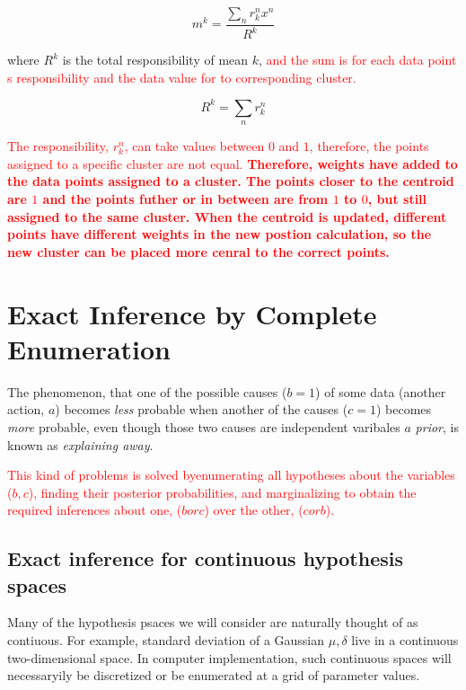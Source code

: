 \documentclass[11pt]{article}
\begin{document}
  \begin{equation}
    m^k = \frac{\sum_n r^n_k x^n}{R^k}
  \label{update}
  \end{equation}

  where $R^k$ is the total responsibility of mean $k$, \textcolor{red}{and the sum is for each data point \textquotesingle s responsibility and the data value for to corresponding cluster.}

  \begin{equation}
    R^k = \sum_n r^n_k 
  \end{equation}

\textcolor{red}{The responsibility, $r^n_k$, can take values between $0$ and $1$, therefore, the points assigned to a specific cluster are not equal. \textbf{Therefore, weights have added to the data points assigned to a cluster. The points closer to the centroid are $1$ and the points futher or in between are from $1$ to $0$, but still assigned to the same cluster. When the centroid is updated, different points have different weights in the new postion calculation, so the new cluster can be placed more cenral to the correct points.}}


\newpage

\section{Exact Inference by Complete Enumeration}
The phenomenon, that one of the possible causes ($b=1$) of some data (another action, $a$) becomes \textit{less} probable when another of the causes ($c = 1$) becomes \textit{more} probable, even though those two causes are independent varibales $a$ \textit{prior}, is known as \textit{explaining away}.

\textcolor{red}{This kind of problems is solved byenumerating all hypotheses about the variables ($b,c$), finding their posterior probabilities, and marginalizing to obtain the required inferences about one, ($b or c$) over the other, ($c or b$).}

\subsection{Exact inference for continuous hypothesis spaces}
Many of the hypothesis psaces we will consider are naturally thought of as contiuous. For example, standard deviation of a Gaussian $\mu, \delta$ live in a continuous two-dimensional space. In computer implementation, such continuous spaces will necessaryily be discretized or be enumerated at a grid of parameter values.
\end{document}
